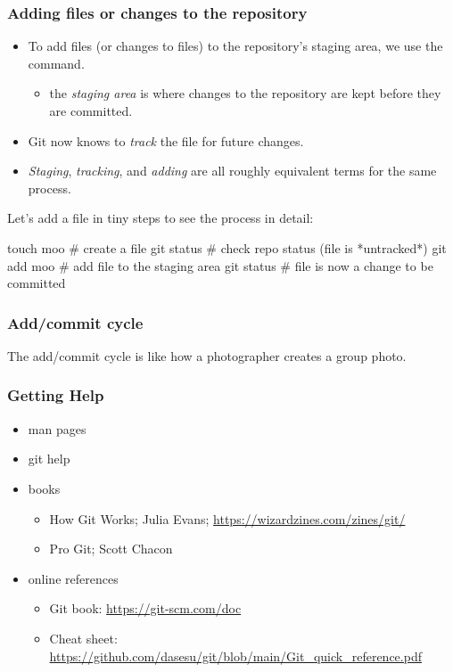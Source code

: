 \begin{frame}[fragile]
\frametitle{Adding files or changes to the repository}
\begin{itemize}
    \item To add files (or changes to files) to the repository's
        staging area, we use the  command.
    \begin{itemize}
        \item the \emph{staging area} is where changes to the repository
            are kept before they are committed.
    \end{itemize}
    \item Git now knows to \emph{track} the file for future changes.
    \item \emph{Staging}, \emph{tracking}, and \emph{adding} are all
        roughly equivalent terms for the same process.
\end{itemize}

Let's add a file in tiny steps to see the process in detail:
    \begin{shellcode}
    touch moo     # create a file
    git status    # check repo status (file is *untracked*)
    git add moo   # add file to the staging area
    git status    # file is now a change to be committed
    \end{shellcode}
\end{frame}

\begin{frame}
\frametitle{Add/commit cycle}
The add/commit cycle is like how a photographer creates a group photo.
\end{frame}


\begin{frame}
\frametitle{Getting Help}
\begin{itemize}
    \item man pages
    \item git help
    \item books
    \begin{itemize}
        \item How Git Works; Julia Evans; \url{https://wizardzines.com/zines/git/}
        \item Pro Git; Scott Chacon
    \end{itemize}
    \item online references
    \begin{itemize}
        \item Git book: \url{https://git-scm.com/doc}
        \item Cheat sheet: \url{https://github.com/dasesu/git/blob/main/Git_quick_reference.pdf}
    \end{itemize}
\end{itemize}
\end{frame}

